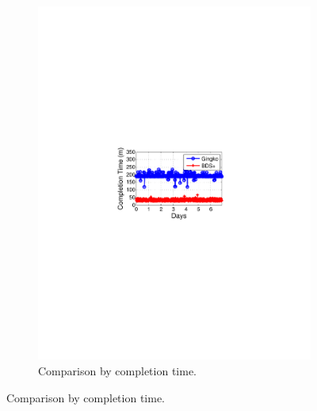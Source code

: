 \begin{figure}[t]
\begin{subfigure}[b]{0.3\textwidth}
                \includegraphics[width=\textwidth]{images/BDSvsAnon_time_journal.pdf}%
                \caption{Comparison by completion time.}
                \label{fig:BDSvsAnon:time}
        \end{subfigure}
        \label{fig:BDSvsAnon}
\vspace{-0.4cm}
\end{figure}

